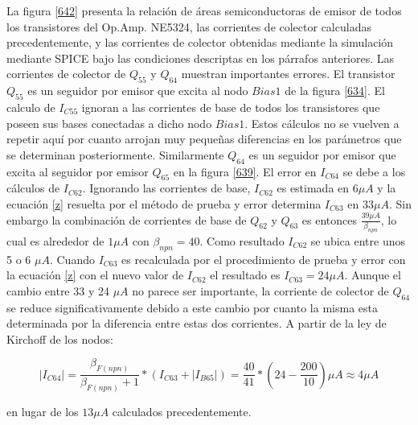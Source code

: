 \documentclass[12pt,a4paper,final,headinclude,footinclude,BCOR5mm]{scrartcl}
\begin{document}
La figura \ref{642} presenta la relación de áreas semiconductoras de emisor de todos los transistores del Op.Amp. NE5324, las corrientes de colector calculadas precedentemente, y las corrientes de colector obtenidas mediante la simulación mediante SPICE bajo las condiciones descriptas en los párrafos anteriores. Las corrientes de colector de $Q_{55}$ y $Q_{64}$ muestran importantes errores. El transistor $Q_{55}$ es un seguidor por emisor que excita al nodo $Bias1$ de la figura \ref{634}. El calculo de $I_{C55}$ ignoran a las corrientes de base de todos los transistores que poseen sus bases conectadas a dicho nodo $Bias1$. Estos cálculos no se vuelven a repetir aquí por cuanto arrojan muy pequeñas diferencias en los parámetros que se determinan posteriormente. Similarmente $Q_{64}$ es un seguidor por emisor que excita al seguidor por emisor $Q_{65}$ en la figura \ref{639}. El error en $I_{C64}$ se debe a los cálculos de $I_{C62}$. Ignorando las corrientes de base, $I_{C62}$ es estimada en $6 \mu A$ y la ecuación \ref{z} resuelta por el método de prueba y error determina $I_{C63}$ en $33 \mu A$. Sin embargo la combinación de corrientes de base de $Q_{62}$ y $Q_{63}$ es entonces $\frac{39 \mu A}{\beta_{npn}}$, lo cual es alrededor de $1 \mu A$ con $\beta_{npn} = 40$. Como resultado $I_{C62}$ se ubica entre unos 5 o 6 $\mu A$. Cuando $I_{C63}$ es recalculada por el procedimiento de prueba y error con la ecuación \ref{z} con el nuevo valor de $I_{C62}$ el resultado es $I_{C63} = 24 \mu A$. Aunque el cambio entre 33 y 24 $\mu A$ no parece ser importante, la corriente de colector de $Q_{64}$ se reduce significativamente debido a este cambio por cuanto la misma esta determinada por la diferencia entre estas dos corrientes. A partir de la ley de Kirchoff de los nodos:

$$|I_{C64}| = \frac{\beta_{F(npn)}}{\beta_{F(npn)} + 1} * (I_{C63} + |I_{B65}|) = \frac{40}{41} * (24-\frac{200}{10}) \mu A \approx 4 \mu A$$

en lugar de los $13 \mu A$ calculados precedentemente.\\
\end{document}
